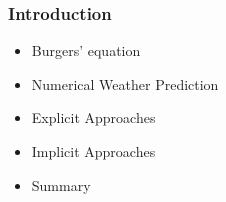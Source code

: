%
%
%


\begin{frame}
  \frametitle{Introduction}
		\begin{itemize}
			\item<1-> Burgers' equation
			\item<2-> Numerical Weather Prediction
			\item<3-> Explicit Approaches
			\item<4-> Implicit Approaches
			\item<5-> Summary
		\end{itemize}
\end{frame}
